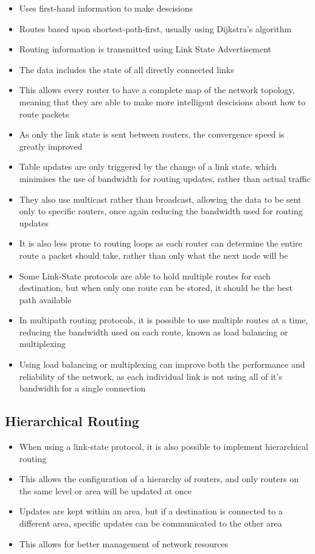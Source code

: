 \begin{itemize}
  \item Uses first-hand information to make descisions
  \item Routes based upon shortest-path-first, usually using Dijkstra's algorithm
  \item Routing information is transmitted using Link State Advertisement
  \item The data includes the state of all directly connected links
  \item This allows every router to have a complete map of the network topology, meaning that they are able to make more intelligent descisions about how to route packets
  \item As only the link state is sent between routers, the convergence speed is greatly improved
  \item Table updates are only triggered by the change of a link state, which minimises the use of bandwidth for routing updates, rather than actual traffic
  \item They also use multicast rather than broadcast, allowing the data to be sent only to specific routers, once again reducing the bandwidth used for routing updates
  \item It is also less prone to routing loops as each router can determine the entire route a packet should take, rather than only what the next node will be
  \item Some Link-State protocols are able to hold multiple routes for each destination, but when only one route can be stored, it should be the best path available
  \item In multipath routing protocols, it is possible to use multiple routes at a time, reducing the bandwidth used on each route, known as load balancing or multiplexing
  \item Using load balancing or multiplexing can improve both the performance and reliability of the network, as each individual link is not using all of it's bandwidth for a single connection
\end{itemize}

\subsection*{Hierarchical Routing}

\begin{itemize}
  \item When using a link-state protocol, it is also possible to implement hierarchical routing
  \item This allows the configuration of a hierarchy of routers, and only routers on the same level or area will be updated at once
  \item Updates are kept within an area, but if a destination is connected to a different area, specific updates can be communicated to the other area
  \item This allows for better management of network resources
\end{itemize}

